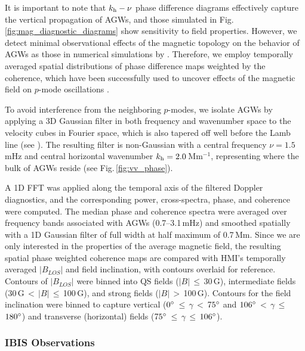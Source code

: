 \documentclass[preprint2,linenumbers]{aastex701}
\begin{document}
It is important to note that $k_{\rm{h}}-\nu$ phase difference diagrams effectively capture the vertical propagation of AGWs, and those simulated in Fig.\,\ref{fig:mag_diagnostic_diagrams} show sensitivity to field properties.
However, we detect minimal observational effects of the magnetic topology on the behavior of AGWs as those in numerical simulations by \citet{2019_Vigeesh_Roth_Steiner_Jackiewicz}.
Therefore, we employ temporally averaged spatial distributions of phase difference maps weighted by the coherence, which have been successfully used to uncover effects of the magnetic field on $p$-mode oscillations \citep[e.g.,][]{2006_Jefferies_McIntosh_etal, 2007_Vecchio_Cauzzi_Reardon_etal}.

To avoid interference from the neighboring $p$-modes, we isolate AGWs by applying a 3D Gaussian filter in both frequency and wavenumber space to the velocity cubes in Fourier space, which is also tapered off well before the Lamb line (see ).
The resulting filter is non-Gaussian with a central frequency $\nu = 1.5$\,mHz and central horizontal wavenumber $k_{\rm{h}} = 2.0$\,Mm$^{-1}$, representing where the bulk of AGWs reside (see Fig.\,\ref{fig:vv_phase}). 

A 1D FFT was applied along the temporal axis of the filtered Doppler diagnostics, and the corresponding power, cross-spectra, phase, and coherence were computed.
The median phase and coherence spectra were averaged over frequency bands associated with AGWs (0.7--3.1\,mHz) and smoothed spatially with a 1D Gaussian filter of full width at half maximum of 0.7\,Mm.
Since we are only interested in the properties of the average magnetic field, the resulting spatial phase weighted coherence maps are compared with HMI's temporally averaged $|B_{LOS}|$ and field inclination, with contours overlaid for reference.
Contours of $|B_{LOS}|$ were binned into QS fields ($|B|$\,$\leq$\,30\,G), intermediate fields (30\,G\,$<$\,$|B|$\,$\leq$\,100\,G), and strong fields ($|B|$\,$>$\,100\,G).
Contours for the field inclination were binned to capture vertical ($0\degree$\,$\leq$\,$\gamma$\,$<$\,$75\degree$ and $106\degree$\,$<$\,$\gamma$\,$\leq$\,$180\degree$) and transverse (horizontal) fields ($75\degree$\,$\leq$\,$\gamma$\,$\leq$\,$106\degree$).

\subsubsection{IBIS Observations} \label{subsubsec:spatial_ibis_observations}
\end{document}

